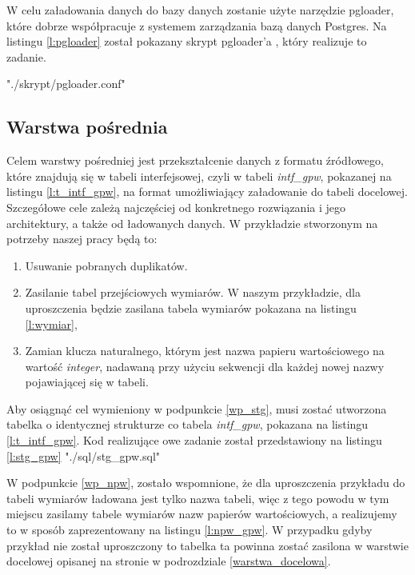 W celu załadowania danych do bazy danych zostanie użyte narzędzie pgloader,
 które dobrze współpracuje z systemem zarządzania bazą danych Postgres.
Na listingu \ref{l:pgloader} został pokazany skrypt pgloader'a , który realizuje to zadanie.


 {"./skrypt/pgloader.conf"}



\subsection{Warstwa pośrednia}

Celem warstwy pośredniej jest przekształcenie danych z formatu źródłowego, które znajdują się w tabeli interfejsowej,
czyli w tabeli \textit{intf\_gpw}, pokazanej na listingu \ref{l:t_intf_gpw},
na format umożliwiający załadowanie do tabeli docelowej.
Szczegółowe cele zależą najczęściej od konkretnego rozwiązania i jego architektury,
 a także od ładowanych danych. 
W przykładzie stworzonym na potrzeby naszej pracy będą to:
\begin{enumerate}
 \item \label{wp_stg}
   Usuwanie pobranych duplikatów.
 \item \label{wp_npw}
  Zasilanie tabel przejściowych wymiarów. W naszym przykładzie, dla uproszczenia będzie zasilana tabela wymiarów pokazana na listingu \ref{l:wymiar},
 \item  \label{wp_promo}
  Zamian klucza naturalnego, 
   którym jest nazwa papieru wartościowego na wartość \textit{integer}, 
   nadawaną przy użyciu  sekwencji dla każdej nowej nazwy pojawiającej się w tabeli.
\end{enumerate}

Aby osiągnąć cel wymieniony w  podpunkcie \ref{wp_stg}, 
 musi zostać utworzona tabelka 
 o identycznej strukturze co tabela \textit{intf\_gpw}, pokazana na listingu \ref{l:t_intf_gpw}.
Kod realizujące owe zadanie został przedstawiony na listingu \ref{l:stg_gpw}
 {"./sql/stg_gpw.sql"}


W podpunkcie \ref{wp_npw}, zostało wspomnione, 
 że dla uproszczenia przykładu do tabeli wymiarów ładowana jest tylko nazwa tabeli, 
 więc z tego powodu w tym miejscu zasilamy tabele wymiarów nazw papierów wartościowych, 
 a realizujemy to w sposób zaprezentowany na listingu \ref{l:npw_gpw}.
W przypadku gdyby przykład nie został uproszczony to tabelka ta powinna zostać zasilona w warstwie docelowej opisanej na stronie
\pageref{warstwa_docelowa} w podrozdziale  \ref{warstwa_docelowa}.

